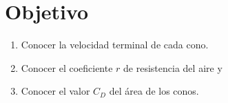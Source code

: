 \section{Objetivo}

\begin{enumerate}
    \item Conocer la velocidad terminal de cada cono.
    \item Conocer el coeficiente $r$ de resistencia del aire y
    \item Conocer el valor $C_D$ del área de los conos.
\end{enumerate}
